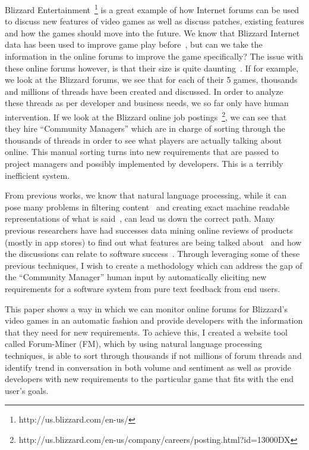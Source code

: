 \documentclass[conference]{IEEEtran}
\begin{document}
Blizzard Entertainment~\footnote{http://us.blizzard.com/en-us/} is a great example of how Internet forums
can be used to discuss new features of video games as well as discuss patches, existing features and
how the games should move into the future. We know that Blizzard Internet data has been used
to improve game play before~\cite{Lewis:2010:MGS}, but can we take the information in the online forums
to improve the game specifically? The issue with these online forums however, is that their size
is quite daunting~\cite{Glance:2005:DMI}. If for example, we look at the Blizzard forums, we see that for each of their 5 games,
thousands and millions of threads have been created and discussed. In order to analyze these threads as
per developer and business needs, we so far only have human intervention. If we look at the Blizzard online job
postings~\footnote{http://us.blizzard.com/en-us/company/careers/posting.html?id=13000DX}, 
we can see that they hire ``Community Managers'' which are in charge of sorting through the thousands
of threads in order to see what players are actually talking about online. This manual sorting turns into
new requirements that are passed to project managers and possibly implemented by developers. This is a terribly
inefficient system.

From previous works, we know that natural language processing, while it can pose many problems in filtering
content~\cite{Chandy:2012:ISI} and creating exact machine readable representations of what is said~\cite{Abney:1996:PST},
can lead us down the correct path. Many previous researchers have had successes data mining online reviews of
products (mostly in app stores) to find out what features are being talked about~\cite{Pagano:2013:FAS} and
how the discussions can relate to software success~\cite{Dave:2003:MPG}. Through leveraging some of these previous
techniques, I wish to create a methodology which can address the gap of the ``Community Manager'' human input
by automatically eliciting new requirements for a software system from pure text feedback from end users.

This paper shows a way in which we can monitor online forums for Blizzard's video games in an automatic fashion
and provide developers with the information that they need for new requirements. To achieve this, I created a website
tool called Forum-Miner (FM), which by using natural language processing techniques, is able to sort
through thousands if not millions of forum threads and identify trend in conversation in both volume and sentiment
as well as provide developers with new requirements to the particular game that fits with the end user's goals.
\end{document}
